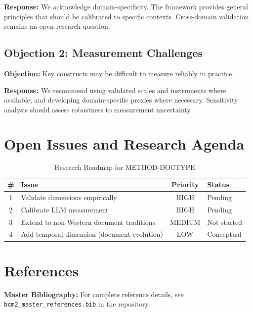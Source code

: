 \textbf{Response:} We acknowledge domain-specificity. The framework provides
general principles that should be calibrated to specific contexts. Cross-domain
validation remains an open research question.

\subsection{Objection 2: Measurement Challenges}

\textbf{Objection:} Key constructs may be difficult to measure reliably in
practice.

\textbf{Response:} We recommend using validated scales and instruments where
available, and developing domain-specific proxies where necessary. Sensitivity
analysis should assess robustness to measurement uncertainty.


\section{Open Issues and Research Agenda}
\label{sec:doctype-open}

\begin{table}[htbp]
\centering
\caption{Research Roadmap for METHOD-DOCTYPE}
\label{tab:doctype-roadmap}
\renewcommand{\arraystretch}{1.3}
\begin{tabular}{@{}clcl@{}}
\toprule
\textbf{\#} & \textbf{Issue} & \textbf{Priority} & \textbf{Status} \\
\midrule
1 & Validate dimensions empirically & HIGH & Pending \\
2 & Calibrate LLM measurement & HIGH & Pending \\
3 & Extend to non-Western document traditions & MEDIUM & Not started \\
4 & Add temporal dimension (document evolution) & LOW & Conceptual \\
\bottomrule
\end{tabular}
\end{table}


\section{References}
\label{sec:doctype-references}

\begin{tcolorbox}[colback=blue!5!white, colframe=blue!75!black]
\textbf{Master Bibliography:} For complete reference details, see
\texttt{bcm2\_master\_references.bib} in the repository.
\end{tcolorbox}

